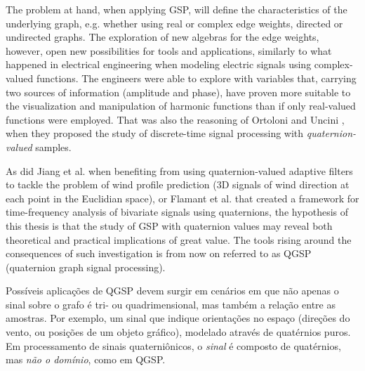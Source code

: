 The problem at hand, when applying GSP, will define the characteristics of the underlying graph, e.g. whether using real or complex edge weights, directed or undirected graphs. The exploration of new algebras for the edge weights, however, open new possibilities for tools and applications, similarly to what happened in electrical engineering when modeling electric signals using complex-valued functions. The engineers were able to explore with variables that, carrying two sources of information (amplitude and phase), have proven more suitable to the visualization and manipulation of harmonic functions than if only real-valued functions were employed. That was also the reasoning of Ortoloni and Uncini \cite{ortolani2016quaternion}, when they proposed the study of discrete-time signal processing with \emph{quaternion-valued} samples.

As did Jiang et al. \cite{jiang2013frequency} when benefiting from using quaternion-valued adaptive filters to tackle the problem of wind profile prediction (3D signals of wind direction at each point in the Euclidian space), or Flamant et al. \cite{flamant2018complete} that created a framework for time-frequency analysis of bivariate signals using quaternions, the hypothesis of this thesis is that the study of GSP with quaternion values may reveal both theoretical and practical implications of great value. The tools rising around the consequences of such investigation is from now on referred to as QGSP (quaternion graph signal processing).

Poss\'iveis aplica\c c\~oes de QGSP devem surgir em cen\'arios em que n\~ao apenas o sinal sobre o grafo \'e tri- ou quadrimensional, mas tamb\'em a rela\c c\~ao entre as amostras. Por exemplo, um sinal que indique orienta\c c\~oes no espa\c co (dire\c c\~oes do vento, ou posi\c c\~oes de um objeto gr\'afico), modelado atrav\'es de quat\'ernios puros. Em processamento de sinais quaterni\^onicos, o \emph{sinal} \'e composto de quat\'ernios, mas \emph{n\~ao o dom\'inio}, como em QGSP.




